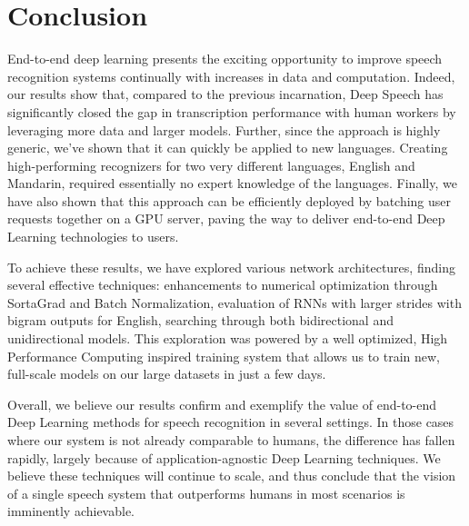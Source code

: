 \section{Conclusion}

End-to-end deep learning presents the exciting opportunity to improve speech
recognition systems continually with increases in data and computation.
Indeed, our results show that, compared to the previous incarnation, Deep
Speech has significantly closed the gap in transcription performance with human
workers by leveraging more data and larger models. Further, since the approach
is highly generic, we've shown that it can quickly be applied to new languages.
Creating high-performing recognizers for two very different languages, English
and Mandarin, required essentially no expert knowledge of the languages.
Finally, we have also shown that this approach can be efficiently deployed by
batching user requests together on a GPU server, paving the way to deliver
end-to-end Deep Learning technologies to users. 

To achieve these results, we have explored various network architectures,
finding several effective techniques: enhancements to numerical optimization
through SortaGrad and Batch Normalization, evaluation of RNNs with larger
strides with bigram outputs for English, searching through both bidirectional
and unidirectional models. This exploration was powered by a well optimized,
High Performance Computing inspired training system that allows us to train
new, full-scale models on our large datasets in just a few days.

Overall, we believe our results confirm and exemplify the value of end-to-end
Deep Learning methods for speech recognition in several settings. In those
cases where our system is not already comparable to humans, the difference has
fallen rapidly, largely because of application-agnostic Deep Learning
techniques. We believe these techniques will continue to scale, and thus
conclude that the vision of a single speech system that outperforms humans in
most scenarios is imminently achievable.
